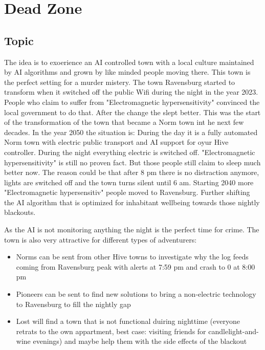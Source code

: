 \chapter{Dead Zone}
\label{ch:dead zone}

\section{Topic}

The idea is to exoerience an AI controlled town with a local culture maintained by AI algorithms and grown by like minded people moving there. This town is the perfect setting for a murder mistery.
The town Ravensburg started to transform when it switched off the public Wifi during the night in the year 2023. People who claim to suffer from "Electromagnetic hypersensitivity" convinced the local government to do that. After the change the slept better.
This was the start of the transformation of the town that became a Norm town int he next few decades. In the year 2050 the situation is: During the day it is a fully automated Norm town with electric public transport and AI support for oyur Hive controller. During the night everything electric is switched off.
"Electromagnetic hypersensitivity" is still no proven fact. But those people still claim to sleep much better now. The reason could be that after 8 pm there is no distraction anymore, lights are switched off and the town turns silent until 6 am.
Starting 2040 more "Electromagnetic hypersensitiv" people moved to Ravensburg. Further shifting the AI algorithm that is optimized for inhabitant wellbeing towards those nightly blackouts.

As the AI is not monitoring anything the night is the perfect time for crime.
The town is also very attractive for different types of adventurers:

\begin{itemize}
    \item Norms can be sent from other Hive towns to investigate why the log feeds coming from Ravensburg peak with alerts at 7:59 pm and crash to 0 at 8:00 pm
    \item Pioneers can be sent to find new solutions to bring a non-electric technology to Ravensburg to fill the nightly gap
    \item Lost will find a town that is not functional duiring nighttime (everyone retrats to the own appartment, best case: visiting friends for candlelight-and-wine evenings) and maybe help them with the side effects of the blackout
\end{itemize}

